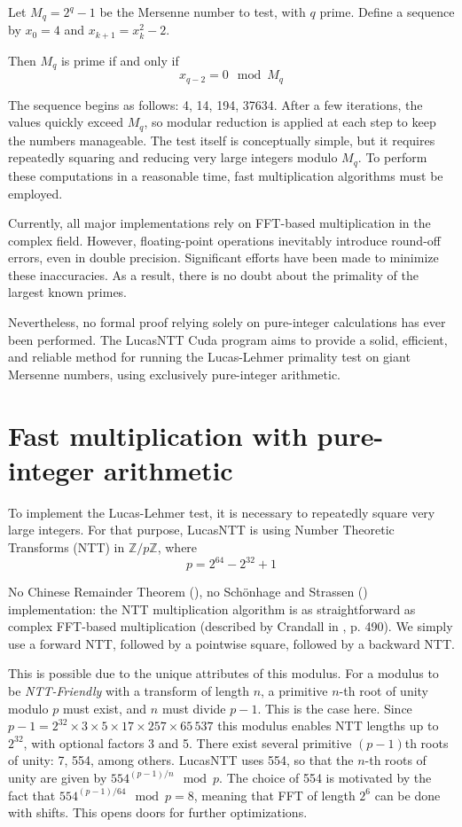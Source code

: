 \documentclass{article}
\begin{document}
Let $M_q = 2^q-1$ be the Mersenne number to test, with $q$ prime. Define a sequence by $x_0 = 4$ and $x_{k+1} = x_k^2 -2$. 

Then $M_q$ is prime if and only if 
\begin{equation*}
    x_{q-2} = 0 \mod M_q
\end{equation*}

The sequence begins as follows: 4, 14, 194, 37634. After a few iterations, the values quickly exceed $M_q$, so modular reduction is applied at each step to keep the numbers manageable. The test itself is conceptually simple, but it requires repeatedly squaring and reducing very large integers modulo $M_q$. To perform these computations in a reasonable time, fast multiplication algorithms must be employed.

Currently, all major implementations rely on FFT-based multiplication in the complex field. However, floating-point operations inevitably introduce round-off errors, even in double precision. Significant efforts have been made to minimize these inaccuracies. As a result, there is no doubt about the primality of the largest known primes.

Nevertheless, no formal proof relying solely on pure-integer calculations has ever been performed. The LucasNTT Cuda program aims to provide a solid, efficient, and reliable method for running the Lucas-Lehmer primality test on giant Mersenne numbers, using exclusively pure-integer arithmetic.

\newpage
\section{Fast multiplication with pure-integer arithmetic}
To implement the Lucas-Lehmer test, it is necessary to repeatedly square very large integers. For that purpose, LucasNTT is using Number Theoretic Transforms (NTT) in $\mathbb{Z}/p\mathbb{Z}$, where
 \begin{equation*}
    p = 2^{64} - 2^{32} + 1
\end{equation*}

No Chinese Remainder Theorem (\cite{Pol71}), no Schönhage and Strassen (\cite{SS70}) implementation: the NTT multiplication algorithm is as straightforward as complex FFT-based multiplication (described by Crandall  in \cite{CP05}, p. 490). We simply use a forward NTT, followed by a pointwise square, followed by a backward NTT.

This is possible due to the unique attributes of this modulus. For a modulus to be \emph{NTT-Friendly} with a transform of length $n$, a primitive $n$-th root of unity modulo $p$ must exist, and $n$ must divide $p-1$. This is the case here. Since $p-1 = 2^{32} \times 3 \times 5 \times 17 \times 257 \times 65\,537$ this modulus enables NTT lengths up to $2^{32}$, with optional factors 3 and 5. There exist several primitive $(p-1)$th roots of unity: 7, 554, among others. LucasNTT uses 554, so that the $n$-th roots of unity are given by $554^{(p-1)/n} \mod p$. The choice of 554 is motivated by the fact that $554^{(p-1)/64} \mod p = 8$, meaning that FFT of length $2^6$ can be done with shifts. This opens doors for further optimizations.
\end{document}
